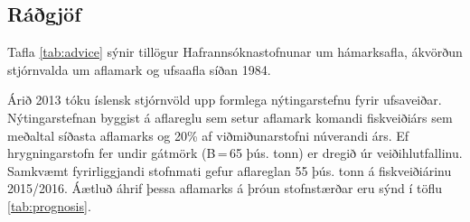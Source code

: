 \documentclass{hafrorep}
\begin{document}
\subsection{Ráðgjöf}

Tafla \ref{tab:advice} sýnir tillögur Hafrannsóknastofnunar um hámarksafla,
ákvörðun stjórnvalda um aflamark og ufsaafla síðan 1984.

Árið 2013 tóku íslensk stjórnvöld upp formlega nýtingarstefnu fyrir ufsaveiðar.
Nýtingarstefnan byggist á aflareglu sem setur aflamark komandi fiskveiðiárs sem
meðaltal síðasta aflamarks og 20\% af viðmiðunarstofni núverandi árs. Ef
hrygningarstofn fer undir gátmörk (B\,=\,65 þús. tonn) er dregið úr
veiðihlutfallinu. Samkvæmt fyrirliggjandi stofnmati gefur aflareglan 55 þús.
tonn á fiskveiðiárinu 2015/2016. Áætluð áhrif þessa aflamarks á þróun
stofnstærðar eru sýnd í töflu \ref{tab:prognosis}.


\end{document}
